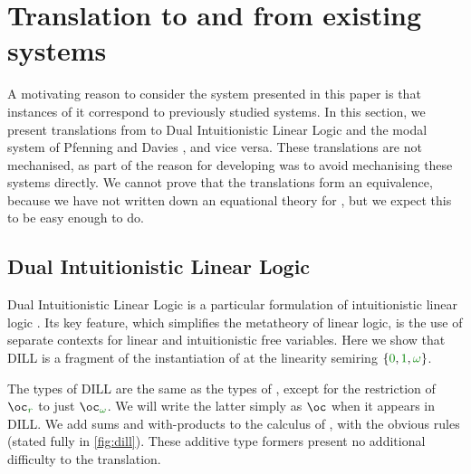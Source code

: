 \documentclass[submission,copyright,creativecommons]{eptcs}
\begin{document}
\section{Translation to and from existing systems}
\label{sec:translation}

A motivating reason to consider the system presented in this paper is that
instances of it correspond to previously studied systems.
In this section, we present translations from \name{} to Dual Intuitionistic
Linear Logic \cite{Barber1996} and the modal system of Pfenning and Davies
\cite{judgmental}, and vice versa.
These translations are not mechanised, as part of the reason for developing
\name{} was to avoid mechanising these systems directly.
We cannot prove that the translations form an equivalence, because we have not
written down an equational theory for \name{}, but we expect this to be easy
enough to do.

\subsection{Dual Intuitionistic Linear Logic}\label{sec:dill}
Dual Intuitionistic Linear Logic is a particular formulation of intuitionistic
linear logic \cite{Barber1996}.
Its key feature, which simplifies the metatheory of linear logic, is the use of
separate contexts for linear and intuitionistic free variables.
Here we show that DILL is a fragment of the instantiation of \name{} at the
linearity semiring $\{\zero, \linear, \unrestricted\}$.

The types of DILL are the same as the types of \name, except for the
restriction of $\excl{r}{}$ to just $\excl{\unrestricted}{}$.
We will write the latter simply as $\oc$ when it appears in DILL\@.
We add sums and with-products to the calculus of \cite{Barber1996}, with the
obvious rules (stated fully in \autoref{fig:dill}).
These additive type formers present no additional difficulty to the translation.
\end{document}
